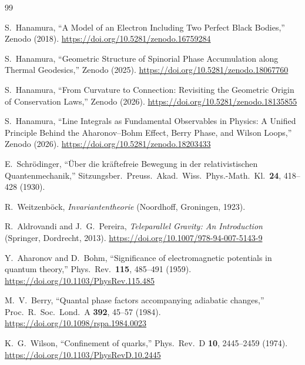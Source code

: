 \documentclass[12pt,letterpaper]{article}
\begin{document}
\begin{thebibliography}{99}


S.~Hanamura,
``A Model of an Electron Including Two Perfect Black Bodies,''
Zenodo (2018).
\href{https://doi.org/10.5281/zenodo.16759284}{https://doi.org/10.5281/zenodo.16759284}

S.~Hanamura,
``Geometric Structure of Spinorial Phase Accumulation along Thermal Geodesics,''
Zenodo (2025).
\href{https://doi.org/10.5281/zenodo.18067760}{https://doi.org/10.5281/zenodo.18067760}

S.~Hanamura,
``From Curvature to Connection: Revisiting the Geometric Origin of Conservation Laws,''
Zenodo (2026).
\href{https://doi.org/10.5281/zenodo.18135855}{https://doi.org/10.5281/zenodo.18135855}

S.~Hanamura,
``Line Integrals as Fundamental Observables in Physics: A Unified Principle Behind the Aharonov--Bohm Effect, Berry Phase, and Wilson Loops,''
Zenodo (2026).
\href{https://doi.org/10.5281/zenodo.18203433}{https://doi.org/10.5281/zenodo.18203433}

E.~Schr\"{o}dinger,
``\"{U}ber die kr\"{a}ftefreie Bewegung in der relativistischen Quantenmechanik,''
Sitzungsber.\ Preuss.\ Akad.\ Wiss.\ Phys.-Math.\ Kl.\ \textbf{24}, 418--428 (1930).

R.~Weitzenb\"{o}ck,
\textit{Invariantentheorie}
(Noordhoff, Groningen, 1923).

R.~Aldrovandi and J.~G.~Pereira,
\textit{Teleparallel Gravity: An Introduction}
(Springer, Dordrecht, 2013).
\href{https://doi.org/10.1007/978-94-007-5143-9}{https://doi.org/10.1007/978-94-007-5143-9}

Y.~Aharonov and D.~Bohm,
``Significance of electromagnetic potentials in quantum theory,''
Phys.\ Rev.\ \textbf{115}, 485--491 (1959).
\href{https://doi.org/10.1103/PhysRev.115.485}{https://doi.org/10.1103/PhysRev.115.485}

M.~V.~Berry,
``Quantal phase factors accompanying adiabatic changes,''
Proc.\ R.\ Soc.\ Lond.\ A \textbf{392}, 45--57 (1984).
\href{https://doi.org/10.1098/rspa.1984.0023}{https://doi.org/10.1098/rspa.1984.0023}

K.~G.~Wilson,
``Confinement of quarks,''
Phys.\ Rev.\ D \textbf{10}, 2445--2459 (1974).
\href{https://doi.org/10.1103/PhysRevD.10.2445}{https://doi.org/10.1103/PhysRevD.10.2445}


\end{thebibliography}
\end{document}
